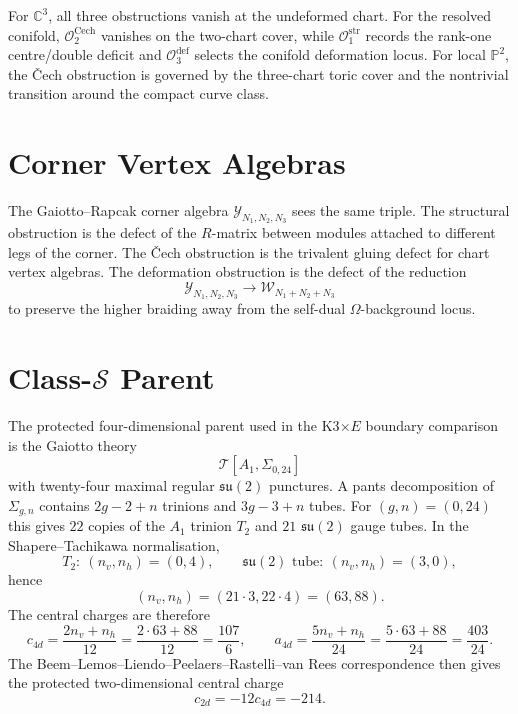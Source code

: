 \documentclass[11pt]{article}
\providecommand{\C}{\mathbb{C}}
\providecommand{\bP}{\mathbb{P}}
\providecommand{\cW}{\mathcal{W}}
\providecommand{\cY}{\mathcal{Y}}
\providecommand{\cT}{\mathcal{T}}
\begin{document}
\begin{example}[$\C^3$, conifold, local $\bP^2$]
For $\C^3$, all three obstructions vanish at the undeformed chart. For
the resolved conifold, $\mathcal O_2^{\mathrm{Cech}}$ vanishes on the
two-chart cover, while $\mathcal O_1^{\mathrm{str}}$ records the
rank-one centre/double deficit and $\mathcal O_3^{\mathrm{def}}$
selects the conifold deformation locus. For local $\bP^2$, the
\v{C}ech obstruction is governed by the three-chart toric cover and the
nontrivial transition around the compact curve class.
\end{example}

\section{Corner Vertex Algebras}

The Gaiotto--Rapcak corner algebra $\cY_{N_1,N_2,N_3}$ sees the same
triple. The structural obstruction is the defect of the $R$-matrix
between modules attached to different legs of the corner. The \v{C}ech
obstruction is the trivalent gluing defect for chart vertex algebras.
The deformation obstruction is the defect of the reduction
\[
  \cY_{N_1,N_2,N_3}\longrightarrow
  \cW_{N_1+N_2+N_3}
\]
to preserve the higher braiding away from the self-dual
$\Omega$-background locus.

\section{Class-\texorpdfstring{$\mathcal S$}{S} Parent}

The protected four-dimensional parent used in the K3$\times E$ boundary
comparison is the Gaiotto theory
\[
  \cT[A_1,\Sigma_{0,24}]
\]
with twenty-four maximal regular $\mathfrak{su}(2)$ punctures. A pants
decomposition of $\Sigma_{g,n}$ contains $2g-2+n$ trinions and
$3g-3+n$ tubes. For $(g,n)=(0,24)$ this gives $22$ copies of the
$A_1$ trinion $T_2$ and $21$ $\mathfrak{su}(2)$ gauge tubes. In the
Shapere--Tachikawa normalisation,
\[
  T_2:\ (n_v,n_h)=(0,4),\qquad
  \mathfrak{su}(2)\text{ tube}:\ (n_v,n_h)=(3,0),
\]
hence
\[
  (n_v,n_h)=(21\cdot3,22\cdot4)=(63,88).
\]
The central charges are therefore
\[
  c_{4d}=\frac{2n_v+n_h}{12}
        =\frac{2\cdot63+88}{12}
        =\frac{107}{6},
  \qquad
  a_{4d}=\frac{5n_v+n_h}{24}
        =\frac{5\cdot63+88}{24}
        =\frac{403}{24}.
\]
The Beem--Lemos--Liendo--Peelaers--Rastelli--van Rees correspondence
then gives the protected two-dimensional central charge
\[
  c_{2d}=-12c_{4d}=-214.
\]
\end{document}
